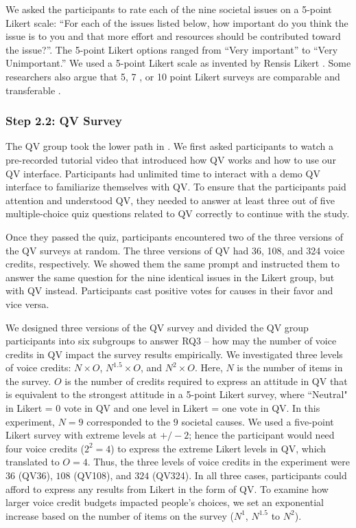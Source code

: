 We asked the participants to rate each of the nine societal issues on a 5-point Likert scale: 
``For each of the issues listed below, how important do you think the issue is to you and that more effort and resources should be contributed toward the issue?''. The 5-point Likert options ranged from ``Very important'' to ``Very Unimportant.'' We used a 5-point Likert scale as invented by Rensis Likert \cite{likert1932technique}. Some researchers also argue that 5, 7 , or 10 point Likert surveys are comparable and transferable \cite{dawes2008data}.


\subsubsection{Step 2.2: QV Survey}
The QV group took the lower path in . We first asked participants to watch a pre-recorded tutorial video that introduced how QV works and how to use our QV interface. Participants had unlimited time to interact with a demo QV interface to familiarize themselves with QV. To ensure that the participants paid attention and understood QV, they needed to answer at least three out of five multiple-choice quiz questions related to QV correctly to continue with the study.

Once they passed the quiz, participants encountered two of the three versions of the QV surveys at random. The three versions of QV had 36, 108, and 324 voice credits, respectively. We showed them the same prompt and instructed them to answer the same question for the nine identical issues in the Likert group, but with QV instead. Participants cast positive votes for causes in their favor and vice versa.

We designed three versions of the QV survey and divided the QV group participants into six subgroups to answer RQ3 -- how may the number of voice credits in QV impact the survey results empirically. We investigated three levels of voice credits: $N \times O$, $N^{1.5} \times O$, and $N^2 \times O$. Here, $N$ is the number of items in the survey. $O$ is the number of credits required to express an attitude in QV that is equivalent to the strongest attitude in a 5-point Likert survey, where ``Neutral" in Likert = 0 vote in QV and one level in Likert = one vote in QV. In this experiment, $N=9$ corresponded to the $9$ societal causes. We used a five-point Likert survey with extreme levels at $+/-2$; hence the participant would need four voice credits ($2^2=4$) to express the extreme Likert levels in QV, which translated to $O=4$. Thus, the three levels of voice credits in the experiment were $36$ (QV36), $108$ (QV108), and $324$ (QV324). In all three cases, participants could afford to express any results from Likert in the form of QV. To examine how larger voice credit budgets impacted people's choices, we set an exponential increase based on the number of items on the survey ($N^1$, $N^{1.5}$ to $N^2$).

